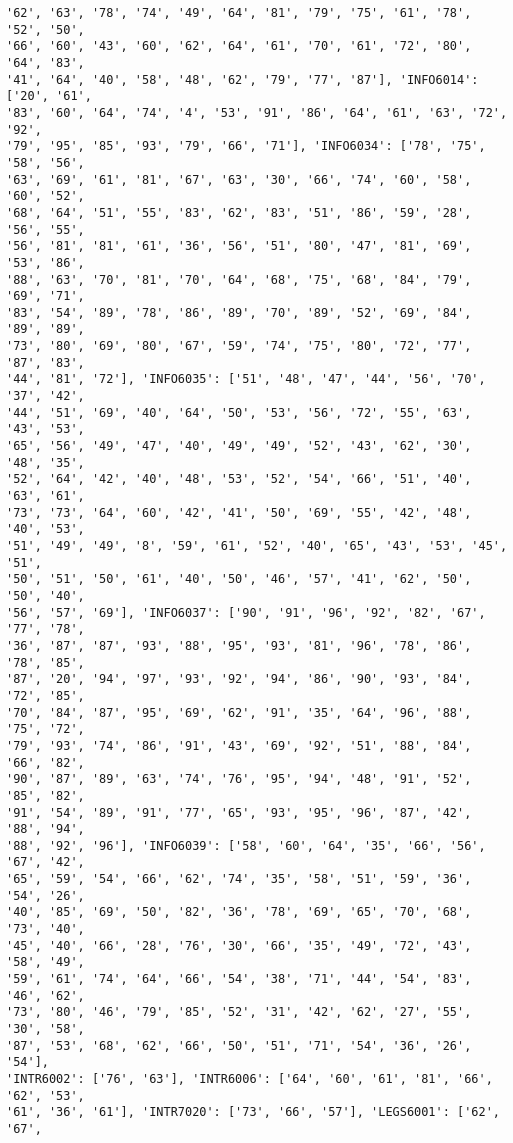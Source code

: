 \documentclass[11pt]{article}
\begin{document}
\begin{Verbatim}[commandchars=\\\{\}]
'62', '63', '78', '74', '49', '64', '81', '79', '75', '61', '78', '52', '50',
'66', '60', '43', '60', '62', '64', '61', '70', '61', '72', '80', '64', '83',
'41', '64', '40', '58', '48', '62', '79', '77', '87'], 'INFO6014': ['20', '61',
'83', '60', '64', '74', '4', '53', '91', '86', '64', '61', '63', '72', '92',
'79', '95', '85', '93', '79', '66', '71'], 'INFO6034': ['78', '75', '58', '56',
'63', '69', '61', '81', '67', '63', '30', '66', '74', '60', '58', '60', '52',
'68', '64', '51', '55', '83', '62', '83', '51', '86', '59', '28', '56', '55',
'56', '81', '81', '61', '36', '56', '51', '80', '47', '81', '69', '53', '86',
'88', '63', '70', '81', '70', '64', '68', '75', '68', '84', '79', '69', '71',
'83', '54', '89', '78', '86', '89', '70', '89', '52', '69', '84', '89', '89',
'73', '80', '69', '80', '67', '59', '74', '75', '80', '72', '77', '87', '83',
'44', '81', '72'], 'INFO6035': ['51', '48', '47', '44', '56', '70', '37', '42',
'44', '51', '69', '40', '64', '50', '53', '56', '72', '55', '63', '43', '53',
'65', '56', '49', '47', '40', '49', '49', '52', '43', '62', '30', '48', '35',
'52', '64', '42', '40', '48', '53', '52', '54', '66', '51', '40', '63', '61',
'73', '73', '64', '60', '42', '41', '50', '69', '55', '42', '48', '40', '53',
'51', '49', '49', '8', '59', '61', '52', '40', '65', '43', '53', '45', '51',
'50', '51', '50', '61', '40', '50', '46', '57', '41', '62', '50', '50', '40',
'56', '57', '69'], 'INFO6037': ['90', '91', '96', '92', '82', '67', '77', '78',
'36', '87', '87', '93', '88', '95', '93', '81', '96', '78', '86', '78', '85',
'87', '20', '94', '97', '93', '92', '94', '86', '90', '93', '84', '72', '85',
'70', '84', '87', '95', '69', '62', '91', '35', '64', '96', '88', '75', '72',
'79', '93', '74', '86', '91', '43', '69', '92', '51', '88', '84', '66', '82',
'90', '87', '89', '63', '74', '76', '95', '94', '48', '91', '52', '85', '82',
'91', '54', '89', '91', '77', '65', '93', '95', '96', '87', '42', '88', '94',
'88', '92', '96'], 'INFO6039': ['58', '60', '64', '35', '66', '56', '67', '42',
'65', '59', '54', '66', '62', '74', '35', '58', '51', '59', '36', '54', '26',
'40', '85', '69', '50', '82', '36', '78', '69', '65', '70', '68', '73', '40',
'45', '40', '66', '28', '76', '30', '66', '35', '49', '72', '43', '58', '49',
'59', '61', '74', '64', '66', '54', '38', '71', '44', '54', '83', '46', '62',
'73', '80', '46', '79', '85', '52', '31', '42', '62', '27', '55', '30', '58',
'87', '53', '68', '62', '66', '50', '51', '71', '54', '36', '26', '54'],
'INTR6002': ['76', '63'], 'INTR6006': ['64', '60', '61', '81', '66', '62', '53',
'61', '36', '61'], 'INTR7020': ['73', '66', '57'], 'LEGS6001': ['62', '67',

\end{Verbatim}
\end{document}
